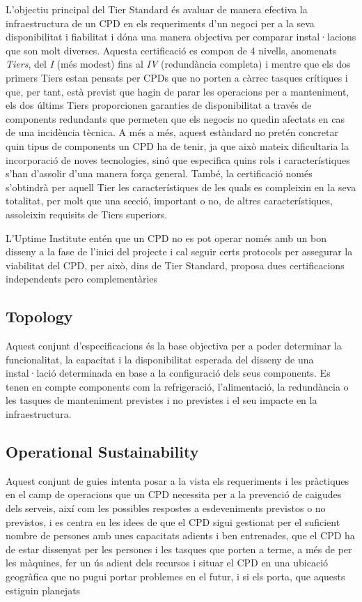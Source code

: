 \documentclass[11pt,a4paper,titlepage]{article}
\begin{document}
    L'objectiu principal del Tier Standard és avaluar de manera efectiva la infraestructura de un CPD en els requeriments d'un negoci per a la seva disponibilitat i fiabilitat i dóna una manera objectiva per comparar instal·lacions que son molt diverses. Aquesta certificació es compon de 4 nivells, anomenats \textit{Tiers}, del \textit{I} (més modest) fins al \textit{IV} (redundància completa) i mentre que els dos primers Tiers estan pensats per CPDs que no porten a càrrec tasques crítiques i que, per tant, està previst que hagin de parar les operacions per a manteniment, els dos últims Tiers proporcionen garanties de disponibilitat a través de components redundants que permeten que els negocis no quedin afectats en cas de una incidència tècnica. A més a més, aquest estàndard no pretén concretar quin tipus de components un CPD ha de tenir, ja que això mateix dificultaria la incorporació de noves tecnologies, sinó que especifica quins rols i característiques s'han d'assolir d'una manera força general. També, la certificació només s'obtindrà per aquell Tier les característiques de les quals es compleixin en la seva totalitat, per molt que una secció, important o no, de altres característiques, assoleixin requisits de Tiers superiors.
    
    L'Uptime Institute entén que un CPD no es pot operar només amb un bon disseny a la fase de l'inici del projecte i cal seguir certs protocols per assegurar la viabilitat del CPD, per això, dins de Tier Standard, proposa dues certificacions independents pero complementàries
    \subsection{Topology}
    Aquest conjunt d'especificacions és la base objectiva per a poder determinar la funcionalitat, la capacitat i la disponibilitat esperada del disseny de una instal·lació determinada en base a la configuració dels seus components. Es tenen en compte components com la refrigeració, l'alimentació, la redundància o les tasques de manteniment previstes i no previstes i el seu impacte en la infraestructura.
    \subsection{Operational Sustainability}
    Aquest conjunt de guies intenta posar a la vista els requeriments i les pràctiques en el camp de operacions que un CPD necessita per a la prevenció de caigudes dels serveis, així com les possibles respostes a esdeveniments previstos o no previstos, i es centra en les idees de que el CPD sigui gestionat per el suficient nombre de persones amb unes capacitats adients i ben entrenades, que el CPD ha de estar dissenyat per les persones i les tasques que porten a terme, a més de per les màquines, fer un ús adient dels recursos i situar el CPD en una ubicació geogràfica que no pugui portar problemes en el futur, i si els porta, que aquests estiguin planejats
    
\end{document}
